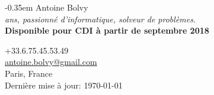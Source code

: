 \documentclass[
  french,
  a4paper
]{resume-openfont}
\begin{document}
\noindent%
\begin{minipage}{.5\textwidth}
\kern-0.35em
{
  \fontsize{28pt}{28pt}
  \selectfont Antoine Bolvy\\
}
\textit{ ans, passionné d'informatique, solveur de problèmes.}\\
\textbf{Disponible pour CDI à partir de septembre 2018}
\vspace{5pt}


\end{minipage}%
\begin{minipage}{.5\textwidth}
\begin{flushright}
\color{headings}+33.6.75.45.53.49\\
\href{mailto:antoine.bolvy@gmail.com}{antoine.bolvy@gmail.com}\\
Paris, France\\
{\color{date}\fontsize{7pt}{12pt}\selectfont{}Dernière mise à jour: \today}
\end{flushright}
\end{minipage}

\noindent\makebox[\linewidth]{
{\color{headingsrulegray}\rule{\paperwidth}{0.4pt}}}
\vspace{-18pt}

%
%
\end{document}
